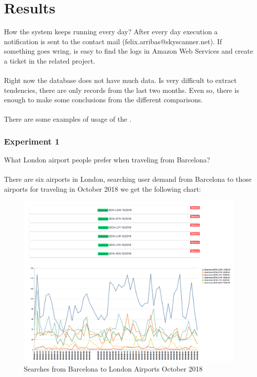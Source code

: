 
\chapter{Results}

\label{chapter08}

How the system keeps running every day? After every day execution a notification is sent to the contact mail (felix.arribas@skyscanner.net). If something goes wring, is easy to find the logs in Amazon Web Services and create a ticket in the related project.
\\\\
Right now the database does not have much data. Is very difficult to extract tendencies, there are only records from the last two months. Even so, there is enough to make some conclusions from the different comparisons.
\\\\
There are some examples of usage of the \thesis.

\subsection*{Experiment 1} \label{exp1}

What London airport people prefer when traveling from Barcelona?
\\\\
There are six airports in London, searching user demand from Barcelona to those airports for traveling in October 2018 we get the following chart:

\begin{figure}[H]
\centering
\includegraphics[scale=0.3]{resources/experiment01.png}
\caption{Searches from Barcelona to London Airports October 2018}
\end{figure}

